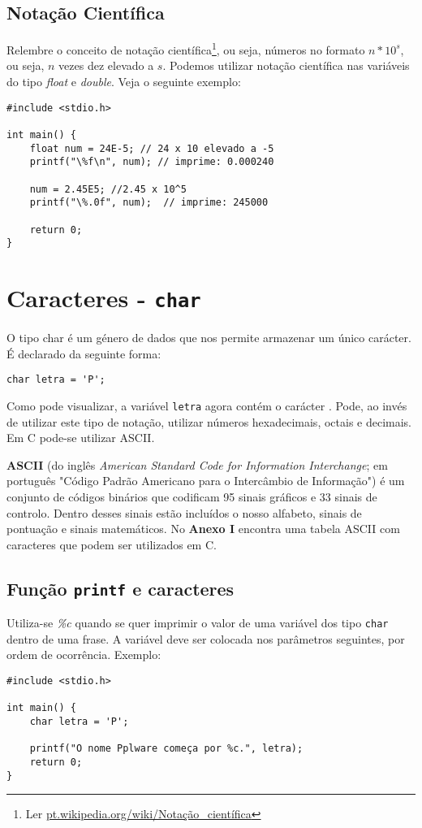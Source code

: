 \subsection{Notação Científica}

Relembre o conceito de notação científica\footnote{Ler \color{links}\href{http://pt.wikipedia.org/wiki/Nota\%C3\%A7\%C3\%A3o_cient\%C3\%ADfica}{pt.wikipedia.org/wiki/Notação\_científica}}, ou seja, números no formato \(n*10^s\), ou seja, \(n\) vezes dez elevado a \(s\). Podemos utilizar notação científica nas variáveis do tipo \textit{float} e \textit{double}. Veja o seguinte exemplo:

\begin{lstlisting}
#include <stdio.h>
 
int main() {    
    float num = 24E-5; // 24 x 10 elevado a -5
    printf("\%f\n", num); // imprime: 0.000240
 
    num = 2.45E5; //2.45 x 10^5
    printf("\%.0f", num);  // imprime: 245000
 
    return 0;
}
\end{lstlisting}

\section{Caracteres - \texttt{char}}

O tipo char é um género de dados que nos permite armazenar um único carácter. É declarado da seguinte forma:

\begin{lstlisting}
char letra = 'P';
\end{lstlisting}

Como pode visualizar, a variável \texttt{letra} agora contém o carácter . Pode, ao invés de utilizar este tipo de notação, utilizar números hexadecimais, octais e decimais. Em C pode-se utilizar ASCII.

\begin{defi}
\textbf{ASCII} (do inglês \textit{American Standard Code for Information Interchange}; em português "Código Padrão Americano para o Intercâmbio de Informação") é um conjunto de códigos binários que codificam 95 sinais gráficos e 33 sinais de controlo. Dentro desses sinais estão incluídos o nosso alfabeto, sinais de pontuação e sinais matemáticos. No \textbf{Anexo I} encontra uma tabela ASCII com caracteres que podem ser utilizados em C.
\end{defi}

\subsection{Função \texttt{printf} e caracteres}

Utiliza-se \textit{\%c} quando se quer imprimir o valor de uma variável dos tipo \texttt{char} dentro de uma frase. A variável deve ser colocada nos parâmetros seguintes, por ordem de ocorrência. Exemplo:

\begin{lstlisting}
#include <stdio.h>
 
int main() {    
    char letra = 'P';
 
    printf("O nome Pplware começa por %c.", letra);   
    return 0;
}
\end{lstlisting}